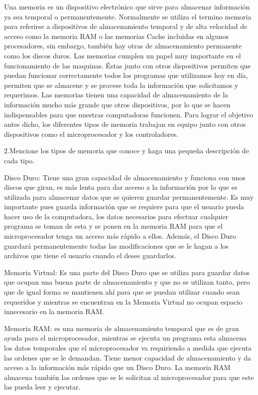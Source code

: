 \documentclass{article}
\begin{document}
Una memoria es un dispositivo electrónico que sirve para almacenar información ya sea temporal o permanentemente. Normalmente se utiliza el termino memoria para referirse a dispositivos de almacenamiento temporal y de alta velocidad de acceso como la memoria RAM o las memorias Cache incluidas en algunos procesadores, sin embargo, también hay otras de almacenamiento permanente como los discos duros.
Las memorias cumplen un papel muy importante en el funcionamiento de las maquinas. Éstas junto con otros dispositivos permiten que puedan funcionar correctamente todos los programas que utilizamos hoy en día, permiten que se almacene y se procese toda la información que solicitamos y requerimos. Las memorias tienen una capacidad de almacenamiento de la información mucho más grande que otros dispositivos, por lo que se hacen indispensables para que nuestras computadoras funcionen. Para lograr el objetivo antes dicho, los diferentes tipos de memoria trabajan en equipo junto con otros dispositivos como el microprocesador y los controladores.

2.Mencione los tipos de memoria que conoce y haga una pequeña descripción de cada tipo.

Disco Duro: Tiene una gran capacidad de almacenamiento y funciona con unos discos que giran, es más lenta para dar acceso a la información por lo que es utilizada para almacenar datos que se quieren guardar permanentemente. Es muy importante pues guarda información que se requiere para que el usuario pueda hacer uso de la computadora, los datos necesarios para efectuar cualquier programa se toman de esta y se ponen en la memoria RAM para que el microprocesador tenga un acceso más rápido a ellos. Además, el Disco Duro guardará permanentemente todas las modificaciones que se le hagan a los archivos que tiene el usuario cuando el desee guardarlos.

Memoria Virtual: Es una parte del Disco Duro que se utiliza para guardar datos que ocupan una buena parte de almacenamiento y que no se utilizan tanto, pero que de igual forma se mantienen ahí para que se puedan utilizar cuando sean requeridos y mientras se encuentran en la Memoria Virtual no ocupan espacio innecesario en la memoria RAM.

Memoria RAM: es una memoria de almacenamiento temporal que es de gran ayuda para el microprocesador, mientras se ejecuta un programa esta almacena los datos temporales que el microprocesador va requiriendo a medida que ejecuta las ordenes que se le demandan. Tiene menor capacidad de almacenamiento y da acceso a la información más rápido que un Disco Duro. La memoria RAM almacena también las ordenes que se le solicitan al microprocesador para que este las pueda leer y ejecutar.
 
\end{document}
